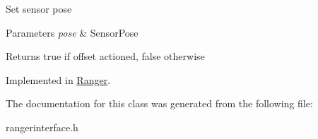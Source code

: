 Set sensor pose 
\begin{DoxyParams}{Parameters}
{\em pose} & Sensor\+Pose \\
\hline
\end{DoxyParams}
\begin{DoxyReturn}{Returns}
true if offset actioned, false otherwise 
\end{DoxyReturn}


Implemented in \hyperlink{classRanger_aa55ad45d83b8c095a495677ac8873f2b}{Ranger}.



The documentation for this class was generated from the following file\+:\begin{DoxyCompactItemize}
\item 
rangerinterface.\+h\end{DoxyCompactItemize}
